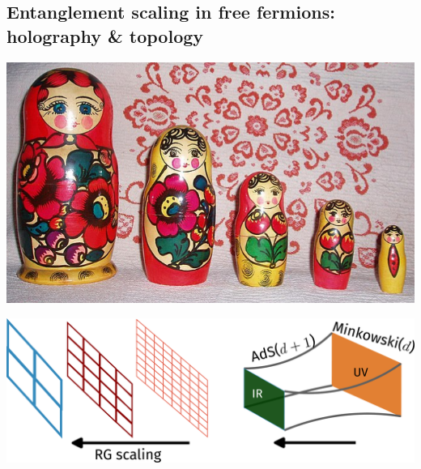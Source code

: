 \documentclass[8pt,aspectratio=169]{beamer}
\begin{document}
\begin{frame}{}
\section{Entanglement scaling in free fermions: holography \& topology}

\begin{minipage}{0.3\textwidth}
	\includegraphics[width=\textwidth]{figures/Matroshka.png}
\end{minipage}
\hspace*{\fill}
\begin{minipage}{0.5\textwidth}
\includegraphics[width=\textwidth]{figures/holography.pdf}
\end{minipage}

\end{frame}
\end{document}
